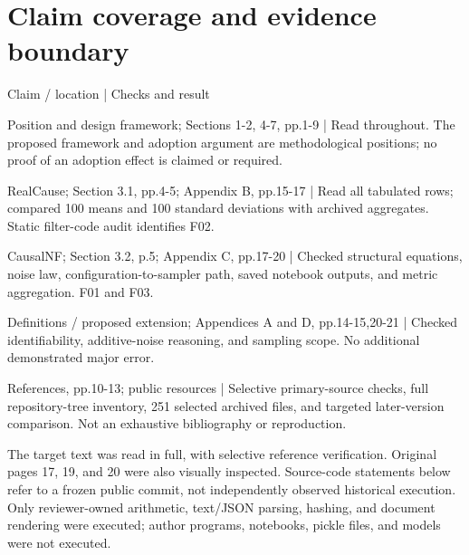 \documentclass[10pt]{article}
\begin{document}
\section*{Claim coverage and evidence boundary}
Claim / location | Checks and result\par
Position and design framework; Sections 1-2, 4-7, pp.1-9 | Read throughout. The proposed framework and adoption argument are methodological positions; no proof of an adoption effect is claimed or required.\par
RealCause; Section 3.1, pp.4-5; Appendix B, pp.15-17 | Read all tabulated rows; compared 100 means and 100 standard deviations with archived aggregates. Static filter-code audit identifies F02.\par
CausalNF; Section 3.2, p.5; Appendix C, pp.17-20 | Checked structural equations, noise law, configuration-to-sampler path, saved notebook outputs, and metric aggregation. F01 and F03.\par
Definitions / proposed extension; Appendices A and D, pp.14-15,20-21 | Checked identifiability, additive-noise reasoning, and sampling scope. No additional demonstrated major error.\par
References, pp.10-13; public resources | Selective primary-source checks, full repository-tree inventory, 251 selected archived files, and targeted later-version comparison. Not an exhaustive bibliography or reproduction.\par
The target text was read in full, with selective reference verification. Original pages 17, 19, and 20 were also visually inspected. Source-code statements below refer to a frozen public commit, not independently observed historical execution. Only reviewer-owned arithmetic, text/JSON parsing, hashing, and document rendering were executed; author programs, notebooks, pickle files, and models were not executed.\par
\end{document}
